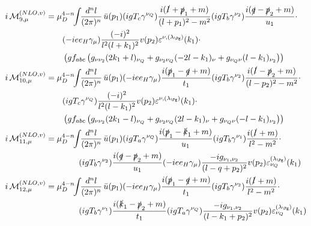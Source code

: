\begin{align}
i\Md^{(NLO,v)}_{9,\mu} &=\mu_D^{4-n}\!\!\int\!\!\frac{d^nl}{(2\pi)^n}\,\bar u(p_1)(igT_c\gamma^{\nu_Q})\frac{i(\slashed{l}+\slashed{p}_1+m)}{(l+p_1)^2-m^2}(igT_b\gamma^{\nu_2})\frac{i(\slashed{q}-\slashed{p}_2+m)}{u_1}\cdot\nonumber\\
 &\hspace{20pt}(-i e e_H \gamma_\mu)\frac{(-i)^2}{l^2(l+k_1)^2}v(p_2)\varepsilon^{\nu,(\lambda_{\Pg})}(k_1)\cdot\nonumber\\
 &\hspace{20pt}\left(gf_{abc}\left(g_{\nu\nu_2}(2k_1+l)_{\nu_Q}+g_{\nu_2\nu_Q}(-2l-k_1)_{\nu}+g_{\nu_Q\nu}(l-k_1)_{\nu_2}\right)\right)\\
i\Md^{(NLO,v)}_{10,\mu} &=\mu_D^{4-n}\!\!\int\!\!\frac{d^nl}{(2\pi)^n}\,\bar u(p_1)(-i e e_H \gamma_\mu)\frac{i(\slashed{p}_1-\slashed{q}+m)}{t_1}(igT_b\gamma^{\nu_2})\frac{i(\slashed{l}-\slashed{p}_2+m)}{(l-p_2)^2-m^2}\cdot\nonumber\\
 &\hspace{20pt}(igT_c\gamma^{\nu_Q})\frac{(-i)^2}{l^2(l-k_1)^2}v(p_2)\varepsilon^{\nu,(\lambda_{\Pg})}(k_1)\cdot\nonumber\\
 &\hspace{20pt}\left(gf_{abc}\left(g_{\nu\nu_2}(2k_1-l)_{\nu_Q}+g_{\nu_2\nu_Q}(2l-k_1)_{\nu}+g_{\nu_Q\nu}(-l-k_1)_{\nu_2}\right)\right)\\
i\Md^{(NLO,v)}_{11,\mu} &=\mu_D^{4-n}\!\!\int\!\!\frac{d^nl}{(2\pi)^n}\,\bar u(p_1)(igT_a\gamma^{\nu_Q})\frac{i(\slashed{p}_1-\slashed{k}_1+m)}{u_1}(igT_b\gamma^{\nu_1})\frac{i(\slashed{l}+m)}{l^2-m^2}\cdot\nonumber\\
 &\hspace{40pt}(igT_b\gamma^{\nu_2})\frac{i(\slashed{q}-\slashed{p}_2+m)}{u_1}(-i e e_H \gamma_\mu)\frac{-ig_{\nu_1,\nu_2}}{(l-q+p_2)^2}v(p_2)\varepsilon^{(\lambda_{\Pg})}_{\nu_Q}(k_1)\\
i\Md^{(NLO,v)}_{12,\mu} &=\mu_D^{4-n}\!\!\int\!\!\frac{d^nl}{(2\pi)^n}\,\bar u(p_1)(-i e e_H \gamma_\mu)\frac{i(\slashed{p}_1-\slashed{q}+m)}{t_1}(igT_b\gamma^{\nu_2})\frac{i(\slashed{l}+m)}{l^2-m^2}\cdot\nonumber\\
 &\hspace{40pt}(igT_b\gamma^{\nu_1})\frac{i(\slashed{k}_1-\slashed{p}_2+m)}{t_1}(igT_a\gamma^{\nu_Q})\frac{-ig_{\nu_1,\nu_2}}{(l-k_1+p_2)^2}v(p_2)\varepsilon^{(\lambda_{\Pg})}_{\nu_Q}(k_1)
\end{align}

